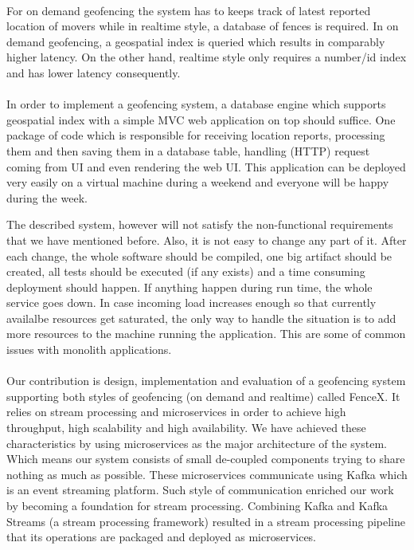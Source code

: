 \documentclass[a4]{report}
\begin{document}
    \paragraph{}
    For on demand geofencing the system has to keeps track of latest reported location of movers while in realtime
    style, a database of fences is required.
    In on demand geofencing, a geospatial index is queried which results in comparably higher latency.
    On the other hand, realtime style only requires a number/id index and has lower latency consequently.

    \paragraph{}
    In order to implement a geofencing system, a database engine which supports geospatial index with a simple MVC\cite{mvc}
    web application on top should suffice.
    One package of code which is responsible for receiving location reports, processing them and then saving them in
    a database table, handling (HTTP) request coming from UI and even rendering the web UI.
    This application can be deployed very easily on a virtual machine during a weekend and everyone will be happy
    during the week.

    The described system, however will not satisfy the non-functional requirements that we have mentioned before.
    Also, it is not easy to change any part of it.
    After each change, the whole software should be compiled, one big artifact should be created, all tests should be
    executed (if any exists) and a time consuming deployment should happen.
    If anything happen during run time, the whole service goes down.
    In case incoming load increases enough so that currently availalbe resources get saturated, the only way to handle
    the situation is to add more resources to the machine running the application.
    This are some of common issues with monolith applications.

    \paragraph{}
    Our contribution is design, implementation and evaluation of a geofencing system supporting both styles of
    geofencing (on demand and realtime) called FenceX\cite{fencex}.
    It relies on stream processing and microservices in order to achieve high throughput, high scalability and high
    availability.
    We have achieved these characteristics by using microservices as the major architecture of the system.
    Which means our system consists of small de-coupled components trying to share nothing as much as possible.
    These microservices communicate using Kafka which is an event streaming platform.
    Such style of communication enriched our work by becoming a foundation for stream processing.
    Combining Kafka and Kafka Streams (a stream processing framework) resulted in a stream processing pipeline that its
    operations are packaged and deployed as microservices.
\end{document}
